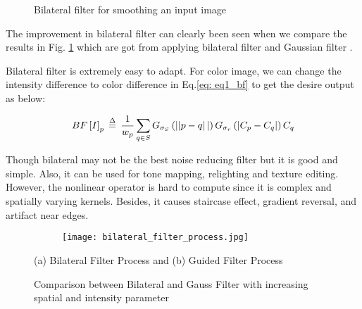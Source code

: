 \begin{figure}[ht]
	\caption{Bilateral filter for smoothing an input image \cite{Paris2008} }
	\label{fig:bilateral_filter}
\end{figure}

The improvement in bilateral filter can clearly been seen when we compare the results in Fig. \ref{fig:bilateral_filter} which are got from applying bilateral filter and Gaussian filter \cite{Gonzalez06DIP, Motwani2004}.

Bilateral filter is extremely easy to adapt. For color image, we can change the intensity difference to color difference in Eq.\ref{eq: eq1_bf} to get the desire output as below:

\begin{equation}\label{eq: eq1_bf_color}
BF\left [ I \right ]_{p}\,\buildrel \Delta \over = \,\frac{1}{w_{p}}\sum_{q \in S}{G_{\sigma _{S}}\left (\left || p-q \right || \right ) G_{\sigma_{r}}}\left ( \left | C_{p}-C_{q} \right | \right )C_{q}
\end{equation} 

Though bilateral may not be the best noise reducing filter but it is good and simple. Also, it can be used for tone mapping, relighting and texture editing. However, the nonlinear operator is hard to compute since it is complex and spatially varying kernels. Besides, it causes staircase effect, gradient reversal, and artifact near edges.

\begin{figure*}[t]
	\centering
	\begin{subfigure}{0.6\textwidth}
		\centering
		\texttt{[image: bilateral\_filter\_process.jpg]}
		\caption{}
		\label{fig:bilateral_filter_process}
	\end{subfigure}
	\begin{subfigure}{0.35\textwidth}
		\caption{}
		\label{fig:guide_filter}
	\end{subfigure}%
	\caption{(a) Bilateral Filter Process and (b) Guided Filter Process }
	\label{fig:guide_bilateral_filter}
\end{figure*}

\begin{figure}[ht]
	\caption{Comparison between Bilateral and Gauss Filter with increasing spatial and intensity parameter  \cite{Paris2008} }
	\label{fig:bilateral_gauss}
\end{figure}

